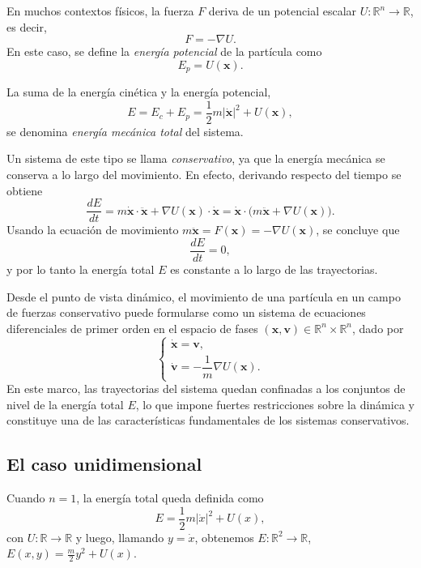 \documentclass[12pt, a4paper]{amsbook}
\newcommand{\R}{{\mathbb R}}
\newcommand{\vv}{{\mathbf v}}
\newcommand{\xx}{{\mathbf x}}
\theoremstyle{remark}
\theoremstyle{definition}
\numberwithin{section}{chapter}
\numberwithin{subsection}{section}
\numberwithin{equation}{section}
\numberwithin{figure}{chapter}
\begin{document}
En muchos contextos físicos, la fuerza $F$ deriva de un potencial escalar $U\colon \R^n \to \R$, es decir,
$$
F = -\nabla U.
$$
En este caso, se define la \emph{energía potencial} de la partícula como
$$
E_p = U(\xx).
$$

La suma de la energía cinética y la energía potencial,
$$
E = E_c + E_p = \frac12 m |\dot\xx|^2 + U(\xx),
$$
se denomina \emph{energía mecánica total} del sistema.

Un sistema de este tipo se llama \emph{conservativo}, ya que la energía mecánica se conserva a lo largo del movimiento. En efecto, derivando respecto del tiempo se obtiene
$$
\frac{dE}{dt}
= m \dot\xx\cdot\ddot\xx + \nabla U(\xx)\cdot \dot\xx
= \dot\xx\cdot\bigl(m\ddot\xx + \nabla U(\xx)\bigr).
$$
Usando la ecuación de movimiento $m\ddot\xx = F(\xx) = -\nabla U(\xx)$, se concluye que
$$
\frac{dE}{dt} = 0,
$$
y por lo tanto la energía total $E$ es constante a lo largo de las trayectorias.

Desde el punto de vista dinámico, el movimiento de una partícula en un campo de fuerzas conservativo puede formularse como un sistema de ecuaciones diferenciales de primer orden en el espacio de fases $(\xx,\vv)\in \R^n\times\R^n$, dado por
$$
\begin{cases}
\dot\xx = \vv, \\
\dot\vv = -\dfrac{1}{m}\nabla U(\xx).
\end{cases}
$$
En este marco, las trayectorias del sistema quedan confinadas a los conjuntos de nivel de la energía total $E$, lo que impone fuertes restricciones sobre la dinámica y constituye una de las características fundamentales de los sistemas conservativos.

\subsection{El caso unidimensional}

Cuando $n=1$, la energía total queda definida como 
$$
E = \frac12 m|\dot x|^2 + U(x),
$$
con $U\colon\R\to\R$ y luego, llamando $y=\dot x$, obtenemos $E\colon \R^2\to\R$, $E(x, y)=\frac{m}{2} y^2 + U(x)$.
\end{document}

